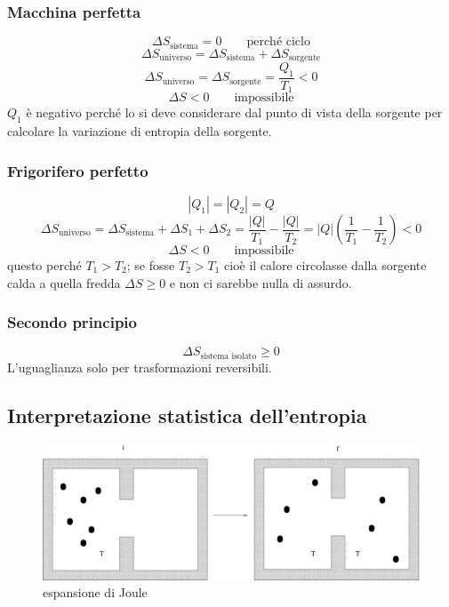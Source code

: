 \subsubsection{Macchina perfetta}

$$\Delta S_\text{sistema}=0 \qquad\text{perché ciclo}$$
$$\Delta S_\text{universo}=\Delta S_\text{sistema}+\Delta S_\text{sorgente}$$
$$\Delta S_\text{universo}=\Delta S_\text{sorgente}=\frac{Q_1}{T_1}<0$$
$$\Delta S<0\qquad \text{impossibile}$$
$Q_1$ è negativo perché lo si deve considerare dal punto di vista della sorgente per calcolare la variazione di entropia della sorgente.

\subsubsection{Frigorifero perfetto}


$$|Q_1|=|Q_2|=Q$$
$$\Delta S_\text{universo}=\Delta S_\text{sistema}+\Delta S_1+\Delta S_2=\frac{|Q|}{T_1}-\frac{|Q|}{T_2}=|Q|\left(\frac{1}{T_1}-\frac{1}{T_2}\right)<0$$
$$\Delta S<0\qquad \text{impossibile}$$
questo perché $T_1>T_2$; se fosse $T_2>T_1$ cioè il calore circolasse dalla sorgente calda a quella fredda $\Delta S\geq 0$ e non ci sarebbe nulla di assurdo.

\subsubsection{Secondo principio}
$$\Delta S_\text{sistema isolato}\geq 0$$
L'uguaglianza solo per trasformazioni reversibili.


\subsection{Interpretazione statistica dell'entropia}
\begin{figure}[htbp]
\centering
\includegraphics[scale=0.45]{immagini/fisica1/exp_Joule}
\caption{espansione di Joule}
\end{figure}

